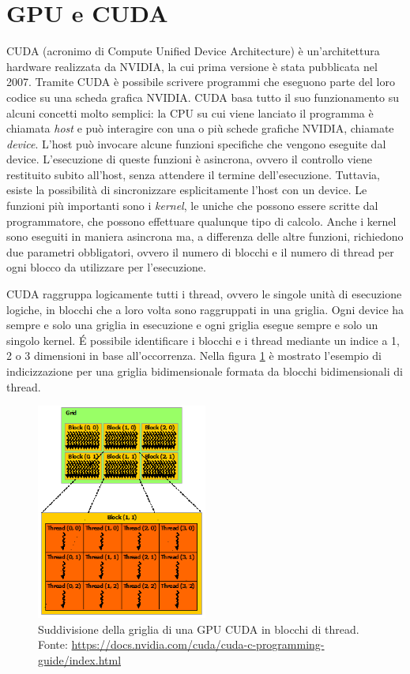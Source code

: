 \documentclass[12pt,a4paper,oneside]{book}
\begin{document}
	\section{GPU e CUDA}
	CUDA (acronimo di Compute Unified Device Architecture) è un'architettura hardware realizzata da NVIDIA, la cui prima versione è stata pubblicata nel 2007. Tramite CUDA è possibile scrivere programmi che eseguono parte del loro codice su una scheda grafica NVIDIA. CUDA basa tutto il suo funzionamento su alcuni concetti molto semplici: la CPU su cui viene lanciato il programma è chiamata \textit{host} e può interagire con una o più schede grafiche NVIDIA, chiamate \textit{device}. L'host può invocare alcune funzioni specifiche che vengono eseguite dal device. L'esecuzione di queste funzioni è asincrona, ovvero il controllo viene restituito subito all'host, senza attendere il termine dell'esecuzione. Tuttavia, esiste la possibilità di sincronizzare esplicitamente l'host con un device. Le funzioni più importanti sono i \textit{kernel}, le uniche che possono essere scritte dal programmatore, che possono effettuare qualunque tipo di calcolo. Anche i kernel sono eseguiti in maniera asincrona ma, a differenza delle altre funzioni, richiedono due parametri obbligatori, ovvero il numero di blocchi e il numero di thread per ogni blocco da utilizzare per l'esecuzione.
	
	CUDA raggruppa logicamente tutti i thread, ovvero le singole unità di esecuzione logiche, in blocchi che a loro volta sono raggruppati in una griglia. Ogni device ha sempre e solo una griglia in esecuzione e ogni griglia esegue sempre e solo un singolo kernel. \'E possibile identificare i blocchi e i thread mediante un indice a 1, 2 o 3 dimensioni in base all'occorrenza. Nella figura \ref{fig:grid-of-thread-blocks} è mostrato l'esempio di indicizzazione per una griglia bidimensionale formata da blocchi bidimensionali di thread.
	
	\begin{figure}[!ht]
		\centering
		\includegraphics[width=0.5\textwidth]{grid-of-thread-blocks}
		\caption[Struttura della griglia di una GPU CUDA]{Suddivisione della griglia di una GPU CUDA in blocchi di thread. Fonte: \url{https://docs.nvidia.com/cuda/cuda-c-programming-guide/index.html}}
		\label{fig:grid-of-thread-blocks}
	\end{figure}
	
\end{document}
